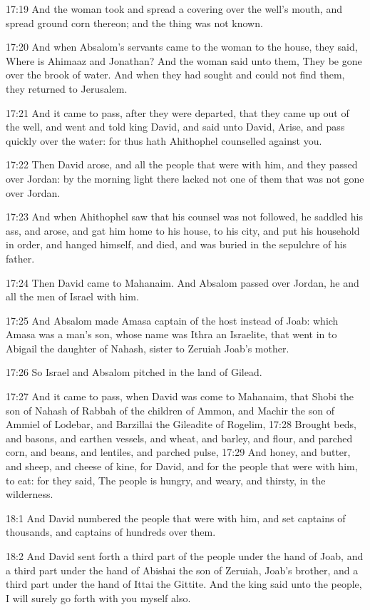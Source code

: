 17:19 And the woman took and spread a covering over the well's mouth,
and spread ground corn thereon; and the thing was not known.

17:20 And when Absalom's servants came to the woman to the house, they
said, Where is Ahimaaz and Jonathan? And the woman said unto them,
They be gone over the brook of water. And when they had sought and
could not find them, they returned to Jerusalem.

17:21 And it came to pass, after they were departed, that they came up
out of the well, and went and told king David, and said unto David,
Arise, and pass quickly over the water: for thus hath Ahithophel
counselled against you.

17:22 Then David arose, and all the people that were with him, and
they passed over Jordan: by the morning light there lacked not one of
them that was not gone over Jordan.

17:23 And when Ahithophel saw that his counsel was not followed, he
saddled his ass, and arose, and gat him home to his house, to his
city, and put his household in order, and hanged himself, and died,
and was buried in the sepulchre of his father.

17:24 Then David came to Mahanaim. And Absalom passed over Jordan, he
and all the men of Israel with him.

17:25 And Absalom made Amasa captain of the host instead of Joab:
which Amasa was a man's son, whose name was Ithra an Israelite, that
went in to Abigail the daughter of Nahash, sister to Zeruiah Joab's
mother.

17:26 So Israel and Absalom pitched in the land of Gilead.

17:27 And it came to pass, when David was come to Mahanaim, that Shobi
the son of Nahash of Rabbah of the children of Ammon, and Machir the
son of Ammiel of Lodebar, and Barzillai the Gileadite of Rogelim,
17:28 Brought beds, and basons, and earthen vessels, and wheat, and
barley, and flour, and parched corn, and beans, and lentiles, and
parched pulse, 17:29 And honey, and butter, and sheep, and cheese of
kine, for David, and for the people that were with him, to eat: for
they said, The people is hungry, and weary, and thirsty, in the
wilderness.

18:1 And David numbered the people that were with him, and set
captains of thousands, and captains of hundreds over them.

18:2 And David sent forth a third part of the people under the hand of
Joab, and a third part under the hand of Abishai the son of Zeruiah,
Joab's brother, and a third part under the hand of Ittai the Gittite.
And the king said unto the people, I will surely go forth with you
myself also.

